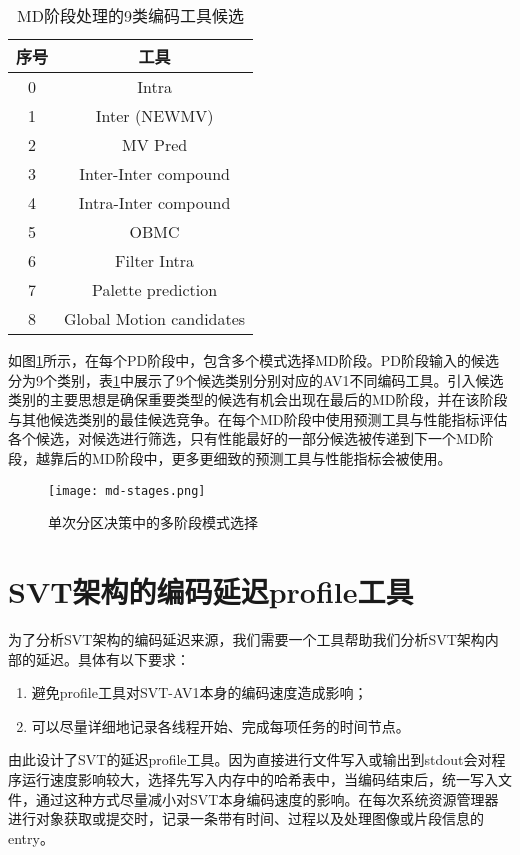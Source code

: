   \begin{table}[htbp]
    \renewcommand{\arraystretch}{0.8}
    \caption{MD阶段处理的9类编码工具候选}
    \label{tab:av1-classes}
    \centering
    \begin{tabular}{cc} \toprule
      序号    & 工具 \\ \midrule
      0& Intra \\
      1& Inter (NEWMV) \\
      2& MV Pred  \\
      3& Inter-Inter compound \\
      4& Intra-Inter compound \\
      5& OBMC \\
      6& Filter Intra \\
      7& Palette prediction \\
      8& Global Motion candidates \\\bottomrule
    \end{tabular}
  \end{table}

  如图\ref{fig:md}所示，在每个PD阶段中，包含多个模式选择MD阶段。PD阶段输入的候选分为9个类别，表\ref{tab:av1-classes}中展示了9个候选类别分别对应的AV1不同编码工具。引入候选类别的主要思想是确保重要类型的候选有机会出现在最后的MD阶段，并在该阶段与其他候选类别的最佳候选竞争。在每个MD阶段中使用预测工具与性能指标评估各个候选，对候选进行筛选，只有性能最好的一部分候选被传递到下一个MD阶段，越靠后的MD阶段中，更多更细致的预测工具与性能指标会被使用。

  \begin{figure}[htbp]
    \centering
    \texttt{[image: md-stages.png]}
    \caption{单次分区决策中的多阶段模式选择\cite{EncoderDesignSVTAV1}}
  \label{fig:md}
  \end{figure}
\section{SVT架构的编码延迟profile工具} \label{sec:svt-profile}
  为了分析SVT架构的编码延迟来源，我们需要一个工具帮助我们分析SVT架构内部的延迟。具体有以下要求：
  \begin{enumerate} [label=\arabic*)]
    \item 避免profile工具对SVT-AV1本身的编码速度造成影响；
    \item 可以尽量详细地记录各线程开始、完成每项任务的时间节点。
  \end{enumerate}

  由此设计了SVT的延迟profile工具。因为直接进行文件写入或输出到stdout会对程序运行速度影响较大，选择先写入内存中的哈希表中，当编码结束后，统一写入文件，通过这种方式尽量减小对SVT本身编码速度的影响。在每次系统资源管理器进行对象获取或提交时，记录一条带有时间、过程以及处理图像或片段信息的entry。

